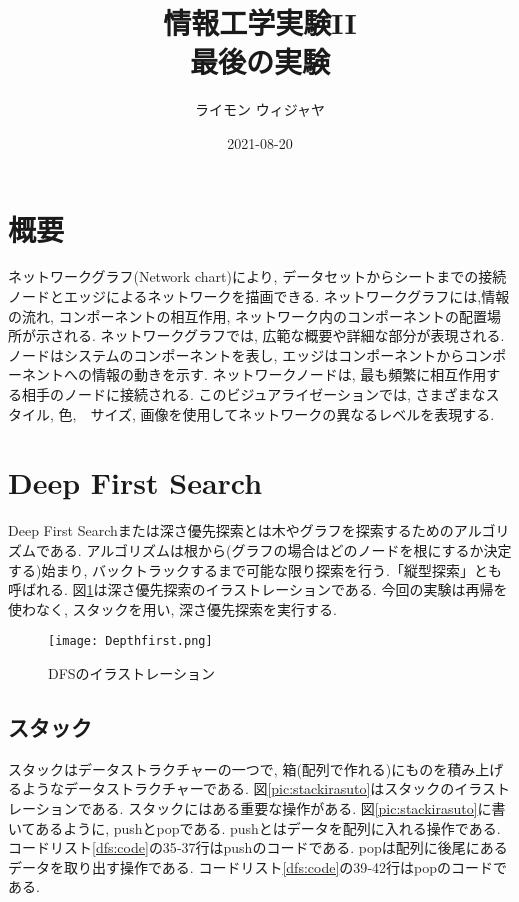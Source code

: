 \documentclass[a4j, titlepage]{jarticle}
\title{情報工学実験II\\最後の実験}
\author{ライモン ウィジャヤ}
\date{2021-08-20}
\begin{document}
\maketitle
\tableofcontents
\clearpage


\section{概要}
ネットワークグラフ(Network chart)により, データセットからシートまでの接続ノードとエッジによるネットワークを描画できる. ネットワークグラフには,情報の流れ, コンポーネントの相互作用, ネットワーク内のコンポーネントの配置場所が示される\cite{gaiyou}.
ネットワークグラフでは, 広範な概要や詳細な部分が表現される. ノードはシステムのコンポーネントを表し, エッジはコンポーネントからコンポーネントへの情報の動きを示す. ネットワークノードは, 最も頻繁に相互作用する相手のノードに接続される. このビジュアライゼーションでは, さまざまなスタイル, 色,　サイズ, 画像を使用してネットワークの異なるレベルを表現する\cite{gaiyou}.

\section{Deep First Search}
Deep First Searchまたは深さ優先探索とは木やグラフを探索するためのアルゴリズムである. アルゴリズムは根から(グラフの場合はどのノードを根にするか決定する)始まり, バックトラックするまで可能な限り探索を行う.「縦型探索」とも呼ばれる\cite{dfs:setsumei}. 図\ref{pic:dfsirasuto}は深さ優先探索のイラストレーションである. 今回の実験は再帰を使わなく, スタックを用い, 深さ優先探索を実行する.

\begin{figure}[tbh]
    \centering \texttt{[image: Depthfirst.png]}
    \caption{DFSのイラストレーション}
    \label{pic:dfsirasuto}
\end{figure}

\subsection{スタック}
スタックはデータストラクチャーの一つで, 箱(配列で作れる)にものを積み上げるようなデータストラクチャーである. 図\ref{pic:stackirasuto}はスタックのイラストレーションである. スタックにはある重要な操作がある. 図\ref{pic:stackirasuto}に書いてあるように, pushとpopである. pushとはデータを配列に入れる操作である. コードリスト\ref{dfs:code}の35‐37行はpushのコードである. popは配列に後尾にあるデータを取り出す操作である. コードリスト\ref{dfs:code}の39‐42行はpopのコードである.
\end{document}
